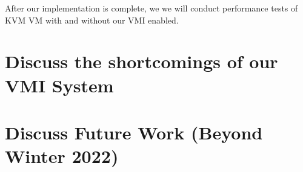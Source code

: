 \documentclass{report}
\begin{document}
\begin{spacing}{1.5}
After our implementation is complete, we we will conduct performance tests of KVM VM with and without our VMI enabled.

\section{Discuss the shortcomings of our VMI System}
\section{Discuss Future Work (Beyond Winter 2022)}


{\large


}














\end{spacing}
\end{document}

